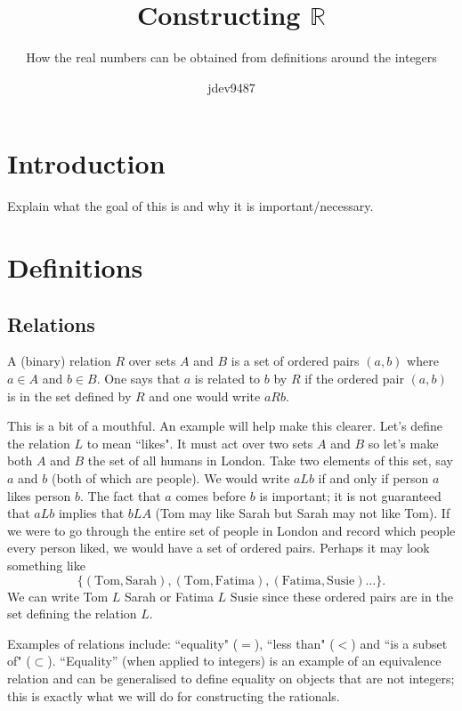 \documentclass[]{scrartcl}
\author{jdev9487}
\title{Constructing $\mathbb{R}$}
\subtitle{How the real numbers can be obtained from definitions around the integers}
\theoremstyle{definition}
\begin{document}
\maketitle

\tableofcontents
\pagebreak

\section{Introduction}
Explain what the goal of this is and why it is important/necessary.

\section{Definitions}
\subsection{Relations}
A (binary) relation $R$ over sets $A$ and $B$ is a set of ordered pairs $(a, b)$  where $a \in A$ and $b \in B$. One says that $a$ is related to $b$ by $R$ if the ordered pair $(a, b)$ is in the set defined by $R$ and one would write $aRb$. 

This is a bit of a mouthful. An example will help make this clearer. Let's define the relation $L$ to mean ``likes". It must act over two sets $A$ and $B$ so let's make both $A$ and $B$ the set of all humans in London. Take two elements of this set, say $a$ and $b$ (both of which are people). We would write $aLb$ if and only if person $a$ likes person $b$. The fact that $a$ comes before $b$ is important; it is not guaranteed that $aLb$ implies that $bLA$ (Tom may like Sarah but Sarah may not like Tom). If we were to go through the entire set of people in London and record which people every person liked, we would have a set of ordered pairs. Perhaps it may look something like
$$
\{(\text{Tom}, {\text{Sarah}}), (\text{Tom}, \text{Fatima}), (\text{Fatima}, \text{Susie})\hdots\}.
$$
We can write Tom $L$ Sarah or Fatima $L$ Susie since these ordered pairs are in the set defining the relation $L$.

Examples of relations include: ``equality" ($=$), ``less than" ($<$) and ``is a subset of" ($\subset$). ``Equality'' (when applied to integers) is an example of an equivalence relation and can be generalised to define equality on objects that are not integers; this is exactly what we will do for constructing the rationals.
\end{document}
